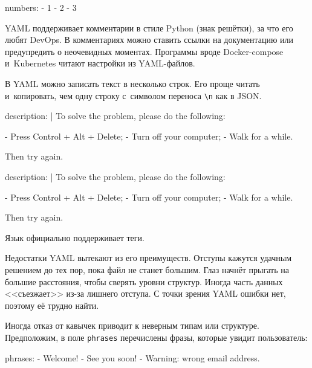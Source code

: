 \begin{english}
  \begin{yaml}
numbers:
  - 1
  - 2
  - 3
  \end{yaml}
\end{english}

YAML поддерживает комментарии в стиле Python (знак решётки), за что его любят
DevOps. В комментариях можно ставить ссылки на документацию или предупредить о
неочевидных моментах. Программы вроде Docker-compose и~Kubernetes читают
настройки из YAML-файлов.

В YAML можно записать текст в несколько строк. Его проще читать и~копировать,
чем одну строку с~символом переноса \verb|\n| как в JSON.

\ifnarrow

\begin{english}
  \begin{yaml}
description: |
  To solve the problem,
  please do the following:

  - Press Control + Alt + Delete;
  - Turn off your computer;
  - Walk for a while.

  Then try again.
  \end{yaml}
\end{english}

\else

\begin{english}
  \begin{yaml}
description: |
  To solve the problem, please do the following:

  - Press Control + Alt + Delete;
  - Turn off your computer;
  - Walk for a while.

  Then try again.
  \end{yaml}
\end{english}

\fi

Язык официально поддерживает теги.


Недостатки YAML вытекают из его преимуществ. Отступы кажутся удачным решением до
тех пор, пока файл не станет большим. Глаз начнёт прыгать на большие расстояния,
чтобы сверять уровни структур. Иногда часть данных <<съезжает>> из-за лишнего
отступа. С точки зрения YAML ошибки нет, поэтому её трудно найти.

Иногда отказ от кавычек приводит к неверным типам или структуре. Предположим, в
поле \verb|phrases| перечислены фразы, которые увидит пользователь:

\begin{english}
  \begin{yaml}
phrases:
  - Welcome!
  - See you soon!
  - Warning: wrong email address.
  \end{yaml}
\end{english}

